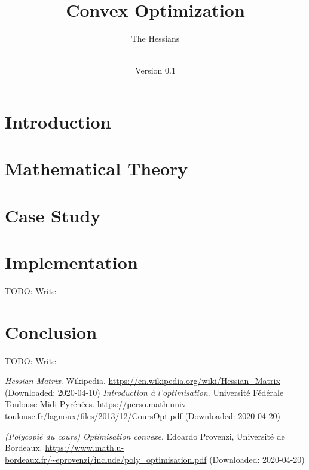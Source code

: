 \documentclass[notitlepage]{article}
\title{Convex Optimization\\}
\author{The Hessians}
\date{\documentdate\\Version 0.1} %
\begin{document}
\maketitle
\projectidentity
\authors

\newpage
\tableofcontents

\newpage
\listoffigures
{} 

\listoftables
{}

\newpage
{}

\section{Introduction}

\newpage

\section{Mathematical Theory}

\newpage

\section{Case Study}

\newpage

\section{Implementation}
TODO: Write
\newpage

\section{Conclusion}
TODO: Write
\newpage

\begin{thebibliography}{9}

	\textit{Hessian Matrix}.
	Wikipedia.
	\url{https://en.wikipedia.org/wiki/Hessian_Matrix} (Downloaded: 2020-04-10)
    \textit{Introduction à l'optimisation}.
    Université Fédérale Toulouse Midi-Pyrénées.
    \url{https://perso.math.univ-toulouse.fr/lagnoux/files/2013/12/CoursOpt.pdf} (Downloaded: 2020-04-20)

    \textit{(Polycopié du cours) Optimisation convexe}.
    Edoardo Provenzi, Université de Bordeaux.
    \url{https://www.math.u-bordeaux.fr/~eprovenzi/include/poly_optimisation.pdf} (Downloaded: 2020-04-20)

\end{thebibliography}
\end{document}
